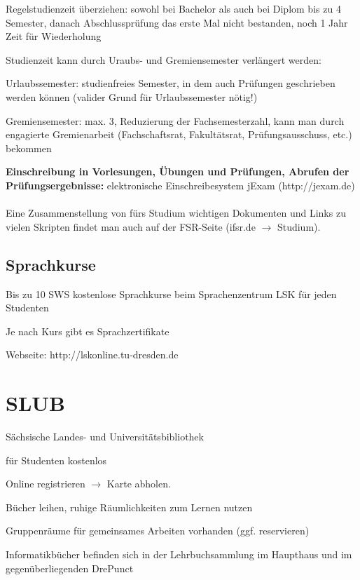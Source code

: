 \documentclass[a4paper,12pt]{report}
\begin{document}
\begin{itemize*}
	\item Regelstudienzeit überziehen: sowohl bei Bachelor als auch bei Diplom bis zu 4 Semester, danach Abschlussprüfung das erste Mal nicht bestanden, noch 1 Jahr Zeit für Wiederholung
	\item Studienzeit kann durch Uraubs- und Gremiensemester verlängert werden:
	\begin{itemize*}
		\item Urlaubssemester: studienfreies Semester, in dem auch Prüfungen geschrieben werden können (valider Grund für Urlaubssemester nötig!)
		\item Gremiensemester: max. 3, Reduzierung der Fachsemesterzahl, kann man durch engagierte Gremienarbeit (Fachschaftsrat, Fakultätsrat, Prüfungsausschuss, etc.) bekommen
	\end{itemize*}
\end{itemize*}

\textbf{Einschreibung in Vorlesungen, Übungen und Prüfungen, Abrufen der Prüfungsergebnisse: }elektronische Einschreibesystem jExam (http://jexam.de)\\\\
Eine Zusammenstellung von fürs Studium wichtigen Dokumenten und Links zu vielen Skripten findet man auch auf der FSR-Seite (ifsr.de $\rightarrow$ Studium).

\subsection{Sprachkurse}
\begin{itemize*}
\item Bis zu 10 SWS kostenlose Sprachkurse beim Sprachenzentrum LSK für jeden Studenten
\item Je nach Kurs gibt es Sprachzertifikate
\item Webseite: http://lskonline.tu-dresden.de
\end{itemize*}

\section{SLUB}
\begin{itemize*}
	\item Sächsische Landes- und Universitätsbibliothek
	\item für Studenten kostenlos
	\item Online registrieren $\rightarrow$ Karte abholen.
	\item Bücher leihen, ruhige Räumlichkeiten zum Lernen nutzen
	\item Gruppenräume für gemeinsames Arbeiten vorhanden (ggf. reservieren)
	\item Informatikbücher befinden sich in der Lehrbuchsammlung im Haupthaus und im gegenüberliegenden \glqq DrePunct\grqq
\end{itemize*}
\end{document}
